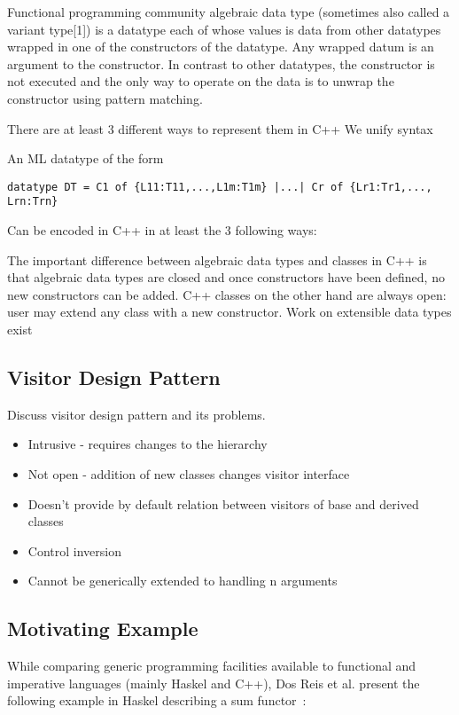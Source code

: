 \documentclass[submission,copyright]{eptcs}
\begin{document}
Functional programming community 
algebraic data type (sometimes also called a variant type[1]) is a datatype each 
of whose values is data from other datatypes wrapped in one of the constructors 
of the datatype. Any wrapped datum is an argument to the constructor. In 
contrast to other datatypes, the constructor is not executed and the only way to 
operate on the data is to unwrap the constructor using pattern matching.

There are at least 3 different ways to represent them in C++
We unify syntax 

An ML datatype of the form 

\begin{lstlisting}
datatype DT = C1 of {L11:T11,...,L1m:T1m} |...| Cr of {Lr1:Tr1,..., Lrn:Trn}
\end{lstlisting}

Can be encoded in C++ in at least the 3 following ways:

The important difference between algebraic data types and classes in C++ is that
algebraic data types are closed and once constructors have been defined, no new
constructors can be added. C++ classes on the other hand are always open: user 
may extend any class with a new constructor. Work on extensible data types 
exist~\cite{ExtensibleDatatypes,LohHinze2006}

\subsection{Visitor Design Pattern}

Discuss visitor design pattern and its problems.

\begin{itemize}
\item Intrusive - requires changes to the hierarchy
\item Not open  - addition of new classes changes visitor interface
\item Doesn't provide by default relation between visitors of base and derived classes
\item Control inversion
\item Cannot be generically extended to handling n arguments
\end{itemize}

\subsection{Motivating Example}

While comparing generic programming facilities available to functional and 
imperative languages (mainly Haskel and C++), Dos Reis et al. present the 
following example in Haskel describing a sum functor~\cite{DRJ05}:
\end{document}
